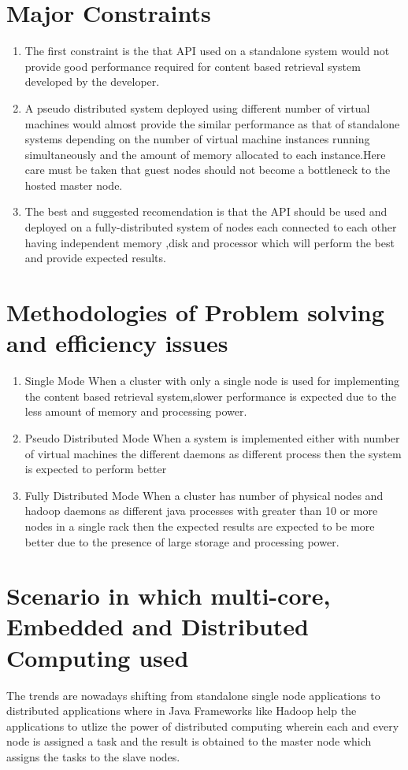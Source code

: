 \documentclass[oneside,a4paper,12pt]{report}
\begin{document}
\section{Major Constraints}
\begin{enumerate}
\item The first constraint is the that API used on a standalone system would not provide good performance required for content based retrieval system developed by the developer.
\item A pseudo distributed system deployed using different number of virtual machines would almost provide the similar performance as that of standalone systems depending on the number of virtual machine instances running simultaneously and the amount of memory allocated to each instance.Here care must be taken that guest nodes should not become a bottleneck to the hosted master node.
\item The best and suggested recomendation is that the API should be used and deployed on a fully-distributed system of nodes each connected to each other having independent memory ,disk and processor which will perform the best and provide expected results.
\end{enumerate}

\section{Methodologies of Problem solving and efficiency issues}
\begin{enumerate}
\item Single Mode
When a cluster with only a single node is used for implementing the content based retrieval system,slower performance is expected due to the less amount of memory and processing power.

\item Pseudo Distributed Mode
When a system is implemented either with number of virtual machines the different daemons as different process then the system is expected to perform better 

\item Fully Distributed Mode
When a cluster has number of physical nodes and hadoop daemons as different java processes with greater than 10 or more nodes in a single rack then the expected results are expected to be more better due to the presence of large storage and processing power.
\end{enumerate}

\section{Scenario in which multi-core, Embedded and Distributed Computing used}
The trends are nowadays shifting from standalone single node applications to distributed applications where in Java Frameworks like Hadoop help the applications to utlize the power of distributed computing wherein each and every node is assigned a task and the result is obtained to the master node which assigns the tasks to the slave nodes.
\end{document}

